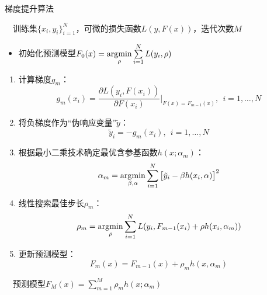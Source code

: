 \begin{algorithm}[htbp]
        \caption{梯度提升算法}
        \begin{algorithmic}
            \REQUIRE ~~训练集$\{x_i,y_i\}_{i=1}^N$，可微的损失函数$L(y,F(x))$，迭代次数$M$ \\
            \STATE
            \begin{itemize}
              \item 初始化预测模型$F_0(x)=\operatorname*{\mathrm{\arg\!\min}}\limits_{\rho} \sum\limits_{i=1}^N L(y_i,\rho)$
            \end{itemize}
            \STATE
            \begin{enumerate}
                \item 计算梯度$g_m$：
                \begin{equation}
                    g_m(x_i) = \frac{\partial L(y_i,F(x_i))}{\partial F(x_i)}\Big |_{F(x) = F_{m-1}(x)}, ~~i=1,\ldots,N
                \end{equation}
                \item 将负梯度作为“伪响应变量”$\tilde{y}$：
                \begin{equation}
                    \tilde{y}_i = -g_m(x_i), ~~i=1,\ldots,N
                \end{equation}
                \item 根据最小二乘技术确定最优含参基函数$h(x;\alpha_m)$：
                \begin{equation}
                    \alpha_m = \operatorname*{\mathrm{\arg\!\min}}_{\beta,\alpha} \sum\limits_{i=1}^N \big[\tilde{y}_i - \beta h(x_i,\alpha)\big]^2
                \end{equation}
                \item 线性搜索最佳步长$\rho_m$：
                \begin{equation}
                    \rho_m = \operatorname*{\mathrm{\arg\!\min}}_{\rho} \sum\limits_{i=1}^N L(y_i, F_{m-1}(x_i) + \rho h(x_i,\alpha_m))
                \end{equation}
                \item 更新预测模型：
                \begin{equation}
                    F_m(x) = F_{m-1}(x) + \rho_m h(x,\alpha_m)
                \end{equation}
            \end{enumerate}
            \ENDFOR
            \ENSURE ~~预测模型$F_M(x) = \sum\limits_{m=1}^M \rho_m h(x;\alpha_m)$
        \end{algorithmic}
\end{algorithm}

